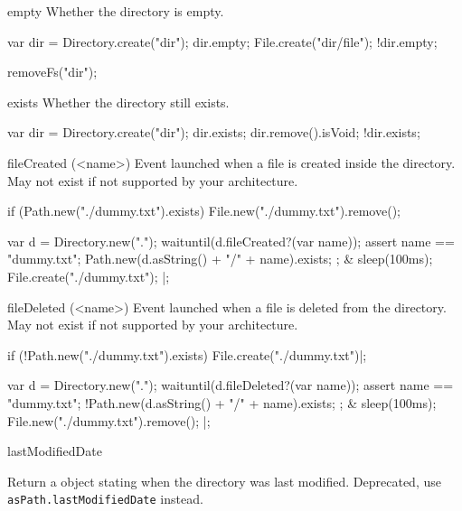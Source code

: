 \begin{urbiscriptapi}
\item[empty]
  Whether the directory is empty.
\begin{urbiassert}
var dir = Directory.create("dir");
dir.empty;
File.create("dir/file");
!dir.empty;
\end{urbiassert}
\begin{urbicomment}
removeFs("dir");
\end{urbicomment}


\item[exists]
  Whether the directory still exists.
\begin{urbiassert}
var dir = Directory.create("dir");
dir.exists;
dir.remove().isVoid;
!dir.exists;
\end{urbiassert}


\item[fileCreated](<name>)%
  Event launched when a file is created inside the directory.
  May not exist if not supported by your architecture.

\begin{urbiscript}[firstnumber=1]
if (Path.new("./dummy.txt").exists)
  File.new("./dummy.txt").remove();

  {
    var d = Directory.new(".");
    waituntil(d.fileCreated?(var name));
    assert
    {
      name == "dummy.txt";
      Path.new(d.asString() + "/" + name).exists;
    };
  }
&
  {
    sleep(100ms);
    File.create("./dummy.txt");
  }|;
\end{urbiscript}


\item[fileDeleted](<name>)%
  Event launched when a file is deleted from the directory.  May not exist
  if not supported by your architecture.
\begin{urbiscript}[firstnumber=1]
if (!Path.new("./dummy.txt").exists)
  File.create("./dummy.txt")|;

  {
    var d = Directory.new(".");
    waituntil(d.fileDeleted?(var name));
    assert
    {
      name == "dummy.txt";
      !Path.new(d.asString() + "/" + name).exists;
    };
  }
&
  {
    sleep(100ms);
    File.new("./dummy.txt").remove();
  }|;
\end{urbiscript}


\item[lastModifiedDate]
  \experimental{}

  Return a  object stating when the directory was last
  modified.  Deprecated, use
  \lstinline|asPath.lastModifiedDate| instead.



\end{urbiscriptapi}
